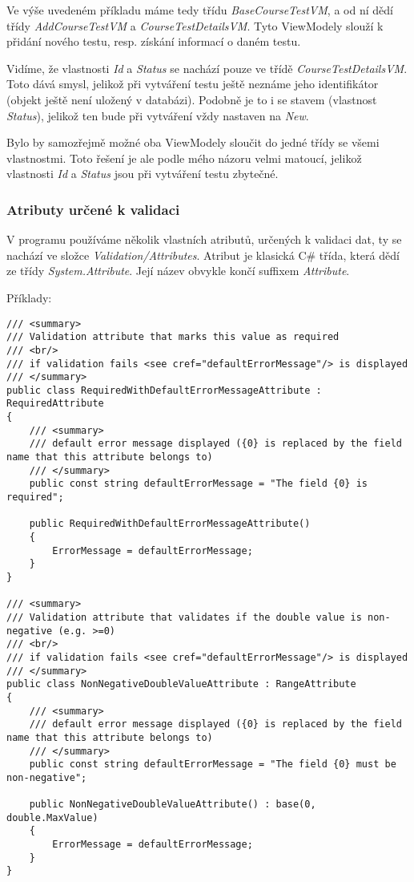 Ve výše uvedeném příkladu máme tedy třídu \textit{BaseCourseTestVM}, a od ní dědí třídy \textit{AddCourseTestVM} a \textit{CourseTestDetailsVM}. Tyto ViewModely slouží k přidání nového testu, resp. získání informací o daném testu.

Vidíme, že vlastnosti \textit{Id} a \textit{Status} se nachází pouze ve třídě \textit{CourseTestDetailsVM}. Toto dává smysl, jelikož při vytváření testu ještě neznáme jeho identifikátor (objekt ještě není uložený v databázi).
Podobně je to i se stavem (vlastnost \textit{Status}), jelikož ten bude při vytváření vždy nastaven na \textit{New}.

Bylo by samozřejmě možné oba ViewModely sloučit do jedné třídy se všemi vlastnostmi. Toto řešení je ale podle mého názoru velmi matoucí, jelikož vlastnosti \textit{Id} a \textit{Status} jsou při vytváření testu zbytečné.

\subsubsection*{Atributy určené k validaci}

V programu používáme několik vlastních atributů, určených k validaci dat, ty se nachází ve složce \textit{Validation/Attributes}.
Atribut je klasická C\# třída, která dědí ze třídy \textit{System.Attribute}. Její název obvykle končí suffixem \textit{Attribute}.

Příklady:
\begin{lstlisting}
/// <summary>
/// Validation attribute that marks this value as required
/// <br/>
/// if validation fails <see cref="defaultErrorMessage"/> is displayed
/// </summary>
public class RequiredWithDefaultErrorMessageAttribute : RequiredAttribute
{
	/// <summary>
	/// default error message displayed ({0} is replaced by the field name that this attribute belongs to)
	/// </summary>
	public const string defaultErrorMessage = "The field {0} is required";
	
	public RequiredWithDefaultErrorMessageAttribute()
	{
		ErrorMessage = defaultErrorMessage;
	}
}

/// <summary>
/// Validation attribute that validates if the double value is non-negative (e.g. >=0)
/// <br/>
/// if validation fails <see cref="defaultErrorMessage"/> is displayed
/// </summary>
public class NonNegativeDoubleValueAttribute : RangeAttribute
{
	/// <summary>
	/// default error message displayed ({0} is replaced by the field name that this attribute belongs to)
	/// </summary>
	public const string defaultErrorMessage = "The field {0} must be non-negative";
	
	public NonNegativeDoubleValueAttribute() : base(0, double.MaxValue)
	{
		ErrorMessage = defaultErrorMessage;
	}
}
\end{lstlisting}

